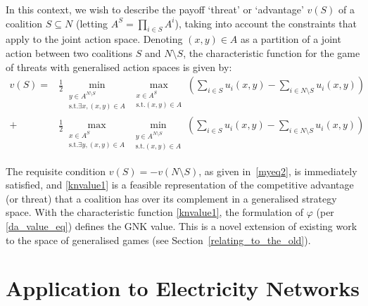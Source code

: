 \documentclass[
10pt, %
a4paper, %
oneside, %
headinclude,footinclude, %
BCOR5mm, %
]{scrartcl}
\begin{document}
In this context, we wish to describe the payoff `threat' or `advantage' $v(S)$ of a coalition $S\subseteq N$ (letting $A^S=\prod_{i\in S}A^i$), taking into account the constraints that apply to the joint action space.
Denoting $(x,y)\in A$ as a partition of a joint action between two coalitions $S$ and $N\setminus S$, 
the characteristic function for the game of threats with generalised action spaces is given by:
\begin{align}
\label{knvalue1}
v(S) = &
\frac{1}{2}\min_{\substack{y\in A^{N\setminus S} \\ \text{s.t.}\exists x,(x,y)\in A}} 
\max_{\substack{x\in A^S \\ \text{s.t.}(x,y)\in A}}
	\left(\sum_{i\in S} u_i(x,y) - \sum_{i\in N\setminus S}u_i(x,y)\right)\nonumber\\
+&
\frac{1}{2}\max_{\substack{x\in A^S \\ \text{s.t.}\exists y,(x,y)\in A}}
\min_{\substack{y\in A^{N\setminus S} \\ \text{s.t.}(x,y)\in A}}
	\left(\sum_{i\in S} u_i(x,y) - \sum_{i\in N\setminus S} u_i(x,y) \right)
\end{align}

The requisite condition $v(S)=-v(N\setminus S)$, as given in~\eqref{myeq2}, is immediately satisfied, and \eqref{knvalue1} is a feasible representation of the competitive advantage (or threat) that a coalition has over its complement in a generalised strategy space.
With the characteristic function \eqref{knvalue1}, the formulation of $\varphi$ (per \eqref{da_value_eq}) defines the GNK value.
This is a novel extension of existing work to the space of generalised games (see Section~\ref{relating_to_the_old}).

\section{Application to Electricity Networks}
\end{document}
